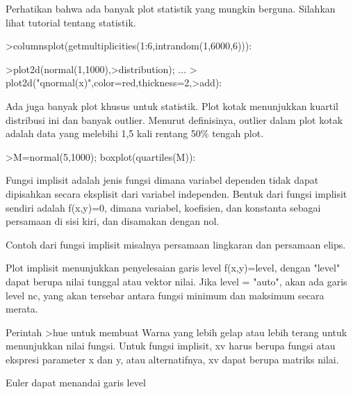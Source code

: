 \documentclass[a4paper,10pt]{article}
\begin{document}
\begin{eulernotebook}
\begin{eulercomment}
\begin{eulercomment}
\begin{eulercomment}
\begin{eulercomment}
\begin{eulercomment}
\begin{eulercomment}
\begin{eulerprompt}
\end{eulerprompt}
\begin{eulercomment}
Perhatikan bahwa ada banyak plot statistik yang mungkin berguna.
Silahkan lihat tutorial tentang statistik.
\end{eulercomment}
\begin{eulerprompt}
>columnsplot(getmultiplicities(1:6,intrandom(1,6000,6))):
\end{eulerprompt}
\begin{eulerprompt}
>plot2d(normal(1,1000),>distribution); ...
>  plot2d("qnormal(x)",color=red,thickness=2,>add):
\end{eulerprompt}
\begin{eulercomment}
Ada juga banyak plot khusus untuk statistik. Plot kotak menunjukkan
kuartil distribusi ini dan banyak outlier. Menurut definisinya,
outlier dalam plot kotak adalah data yang melebihi 1,5 kali rentang
50\% tengah plot.
\end{eulercomment}
\begin{eulerprompt}
>M=normal(5,1000); boxplot(quartiles(M)):
\end{eulerprompt}
\begin{eulercomment}
Fungsi implisit adalah jenis fungsi dimana variabel dependen tidak
dapat dipisahkan secara eksplisit dari variabel independen. Bentuk
dari fungsi implisit sendiri adalah f(x,y)=0, dimana variabel,
koefisien, dan konstanta sebagai persamaan di sisi kiri, dan disamakan
dengan nol.

Contoh dari fungsi implisit misalnya persamaan lingkaran dan persamaan
elips.

Plot implisit menunjukkan penyelesaian garis level f(x,y)=level,
dengan "level" dapat berupa nilai tunggal atau vektor nilai. Jika
level = "auto", akan ada garis level nc, yang akan tersebar antara
fungsi minimum dan maksimum secara merata.

Perintah \textgreater{}hue untuk membuat Warna yang lebih gelap atau lebih terang
untuk menunjukkan nilai fungsi. Untuk fungsi implisit, xv harus berupa
fungsi atau ekspresi parameter x dan y, atau alternatifnya, xv dapat
berupa matriks nilai.

Euler dapat menandai garis level


\end{eulercomment}
\end{eulercomment}
\end{eulercomment}
\end{eulercomment}
\end{eulercomment}
\end{eulercomment}
\end{eulercomment}
\end{eulernotebook}
\end{document}
